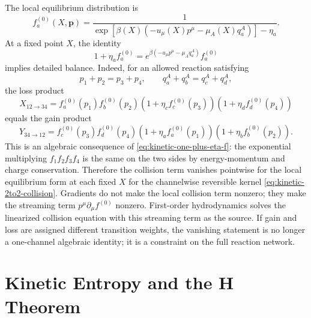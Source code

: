 The local equilibrium distribution is
\begin{equation}
  f_a^{(0)}(X,\mathbf p)
  =
  \frac{1}{\exp[\beta(X)(-u_\mu(X)p^\mu-\mu_A(X)q^A_a)]-\eta_a}.
  \label{eq:kinetic-local-equilibrium-distribution}
\end{equation}
At a fixed point \(X\), the identity
\begin{equation}
  1+\eta_a f_a^{(0)}
  =
  e^{\beta(-u_\mu p^\mu-\mu_Aq^A_a)}f_a^{(0)}
  \label{eq:kinetic-one-plus-eta-f}
\end{equation}
implies detailed balance.  Indeed, for an allowed reaction satisfying
\[
  p_1+p_2=p_3+p_4,
  \qquad
  q_a^A+q_b^A=q_c^A+q_d^A,
\]
the loss product
\[
  X_{12\to34}
  =
  f_a^{(0)}(p_1)f_b^{(0)}(p_2)
  (1+\eta_c f_c^{(0)}(p_3))(1+\eta_d f_d^{(0)}(p_4))
\]
equals the gain product
\[
  Y_{34\to12}
  =
  f_c^{(0)}(p_3)f_d^{(0)}(p_4)
  (1+\eta_a f_a^{(0)}(p_1))(1+\eta_b f_b^{(0)}(p_2)).
\]
This is an algebraic consequence of
\eqref{eq:kinetic-one-plus-eta-f}: the exponential multiplying
\(f_1f_2f_3f_4\) is the same on the two sides by energy-momentum and charge
conservation.  Therefore the collision term vanishes pointwise for the local
equilibrium form at each fixed \(X\) for the channelwise reversible kernel
\eqref{eq:kinetic-2to2-collision}.  Gradients do not make the local collision
term nonzero; they make the streaming term \(p^\mu\partial_\mu f^{(0)}\)
nonzero.  First-order hydrodynamics solves the linearized collision equation
with this streaming term as the source.  If gain and loss are assigned
different transition weights, the vanishing statement is no longer a
one-channel algebraic identity; it is a constraint on the full reaction
network.

\section{Kinetic Entropy and the H Theorem}

